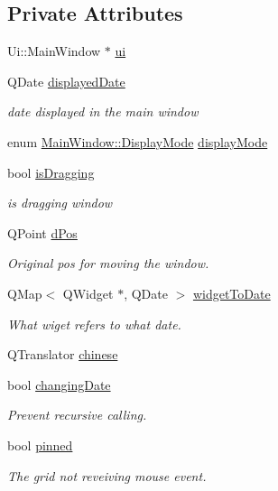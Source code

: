 \subsection*{Private Attributes}
\begin{DoxyCompactItemize}
\item 
Ui\+::\+Main\+Window $\ast$ \hyperlink{classMainWindow_a35466a70ed47252a0191168126a352a5}{ui}
\item 
Q\+Date \hyperlink{classMainWindow_a3d53fc161132967689d4dde0ad7f8a21}{displayed\+Date}
\begin{DoxyCompactList}\small\item\em date displayed in the main window \end{DoxyCompactList}\item 
enum \hyperlink{classMainWindow_a32a99bf8f548bef64c48491cfa6225e8}{Main\+Window\+::\+Display\+Mode} \hyperlink{classMainWindow_a3408763a676b4754ed8f3de394d9c70b}{display\+Mode}
\item 
bool \hyperlink{classMainWindow_ab664d23548b84c308cc3809c1e63aaff}{is\+Dragging}
\begin{DoxyCompactList}\small\item\em is dragging window \end{DoxyCompactList}\item 
Q\+Point \hyperlink{classMainWindow_a98499e8e85458e2dc2ac349964230983}{d\+Pos}
\begin{DoxyCompactList}\small\item\em Original pos for moving the window. \end{DoxyCompactList}\item 
Q\+Map$<$ Q\+Widget $\ast$, Q\+Date $>$ \hyperlink{classMainWindow_ae81ee3cac7678dba0be2fcc37949daa7}{widget\+To\+Date}
\begin{DoxyCompactList}\small\item\em What wiget refers to what date. \end{DoxyCompactList}\item 
Q\+Translator \hyperlink{classMainWindow_a2c428c740faa1094e20f658b2db84dc7}{chinese}
\item 
bool \hyperlink{classMainWindow_a4ba1fa11c17bc9919783f8988f0f6e92}{changing\+Date}
\begin{DoxyCompactList}\small\item\em Prevent recursive calling. \end{DoxyCompactList}\item 
bool \hyperlink{classMainWindow_aac8447a932ef41f544891a8d74d04ab9}{pinned}
\begin{DoxyCompactList}\small\item\em The grid not reveiving mouse event. \end{DoxyCompactList}\end{DoxyCompactItemize}
